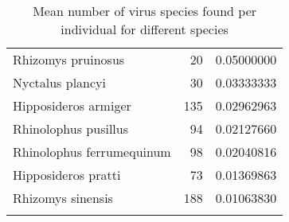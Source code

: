 \documentclass[11pt,article,oneside]{article}
\begin{document}
\begin{longtable}[c]{@{}lrr@{}}
Rhizomys pruinosus & 20 & 0.05000000
\\\addlinespace
Nyctalus plancyi & 30 & 0.03333333
\\\addlinespace
Hipposideros armiger & 135 & 0.02962963
\\\addlinespace
Rhinolophus pusillus & 94 & 0.02127660
\\\addlinespace
Rhinolophus ferrumequinum & 98 & 0.02040816
\\\addlinespace
Hipposideros pratti & 73 & 0.01369863
\\\addlinespace
Rhizomys sinensis & 188 & 0.01063830
\\\addlinespace
\bottomrule
\addlinespace
\caption{Mean number of virus species found per individual for different
species}
\end{longtable}
\end{document}
